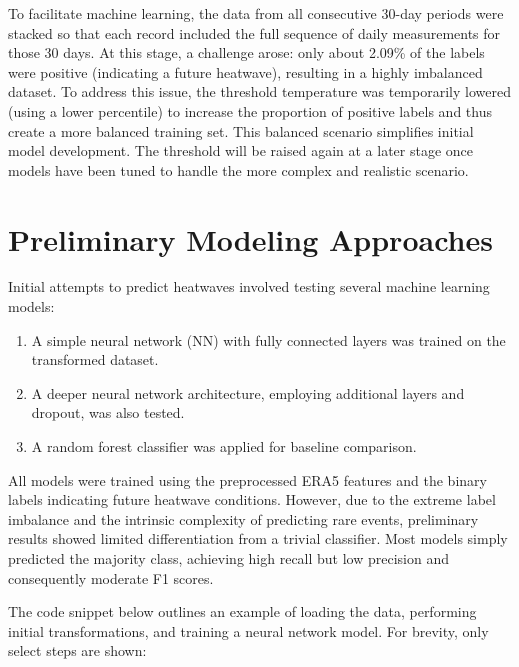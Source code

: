 \documentclass[8pt,a4paper]{article}
\begin{document}
To facilitate machine learning, the data from all consecutive 30-day periods were stacked so that each record included the full sequence of daily measurements for those 30 days. At this stage, a challenge arose: only about 2.09\% of the labels were positive (indicating a future heatwave), resulting in a highly imbalanced dataset. To address this issue, the threshold temperature was temporarily lowered (using a lower percentile) to increase the proportion of positive labels and thus create a more balanced training set. This balanced scenario simplifies initial model development. The threshold will be raised again at a later stage once models have been tuned to handle the more complex and realistic scenario.

\section{Preliminary Modeling Approaches}
Initial attempts to predict heatwaves involved testing several machine learning models:
\begin{enumerate}[1.]
    \item A simple neural network (NN) with fully connected layers was trained on the transformed dataset.
    \item A deeper neural network architecture, employing additional layers and dropout, was also tested.
    \item A random forest classifier was applied for baseline comparison.
\end{enumerate}

All models were trained using the preprocessed ERA5 features and the binary labels indicating future heatwave conditions. However, due to the extreme label imbalance and the intrinsic complexity of predicting rare events, preliminary results showed limited differentiation from a trivial classifier. Most models simply predicted the majority class, achieving high recall but low precision and consequently moderate F1 scores.

The code snippet below outlines an example of loading the data, performing initial transformations, and training a neural network model. For brevity, only select steps are shown:
\end{document}
